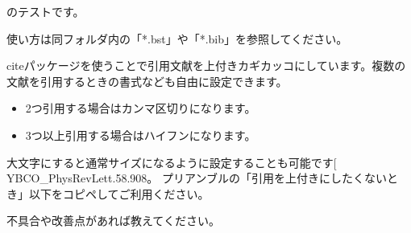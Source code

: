 \documentclass[dvipdfmx]{jsarticle}
\makeatletter
\def\@cite#1{\hspace*{.15em}\textsuperscript{[#1]}}	%
\def\Cite{\@ifnextchar[%
	{\@tempswatrue\let\@cite\@Cite\@citex}
	{\@tempswafalse\let\@cite\@Cite\@citex[]}}
\def\@Cite#1#2{\leavevmode %
	\ifnum\lastpenalty=\z@\penalty\@highpenalty\fi%
	[{\multiply\@highpenalty 3 #1%
		\if@tempswa,\penalty\@highpenalty\ #2\fi %
	}]\spacefactor\@m}
\makeatother
\begin{document}
	\BibTeX のテストです\cite{YBCO_PhysRevLett.58.908}。
	
	使い方は同フォルダ内の「*.bst」や「*.bib」を参照してください。
	
	citeパッケージを使うことで引用文献を上付きカギカッコにしています。複数の文献を引用するときの書式なども自由に設定できます。
	\begin{itemize}\setlength{\itemsep}{3pt}
		\item 2つ引用する場合はカンマ区切りになります\cite{YBCO_PhysRevLett.58.908, Kittel_BA74778859}。
		\item 3つ以上引用する場合はハイフンになります\cite{YBCO_PhysRevLett.58.908, Kittel_BA74778859, website1}。
	\end{itemize}
	
	大文字にすると通常サイズになるように設定することも可能です\Cite{YBCO_PhysRevLett.58.908}。	
	プリアンブルの「引用を上付きにしたくないとき」以下をコピペしてご利用ください。
	
	不具合や改善点があれば教えてください。
	
	
	\clearpage
\end{document}
